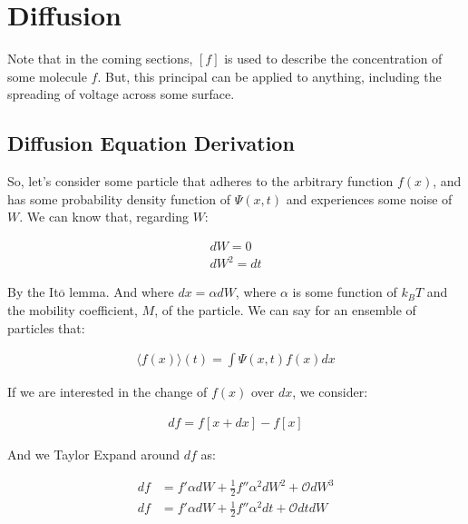 \section{Diffusion}

\label{sec:Diffusion}

 Note that in the coming sections, $[f]$ is used to describe the concentration of some molecule $f$. But, this principal can be applied to anything, including the spreading of voltage across some surface. 

 \subsection{Diffusion Equation Derivation}

So, let's consider some particle that adheres to the arbitrary function $f(x)$, and has some probability density function of $\Psi(x,t)$ and experiences some noise of $W$. We can know that, regarding $W$:

\begin{equation}
\begin{split}
    dW = 0 \\
    dW^2 = dt
\end{split}
\end{equation}

By the It$\overline{\mathrm{o}}$ lemma. And where $dx = \alpha dW$, where $\alpha$ is some function of $k_BT$ and the mobility coefficient, $M$, of the particle. We can say for an ensemble of particles that: 

\begin{equation}
\begin{split}
    \langle f(x) \rangle(t) = \int \Psi(x,t) f(x) dx
\end{split}
\end{equation}

If we are interested in the change of $f(x)$ over $dx$, we consider: 

\begin{equation}
\begin{split}
    df = f[x + dx] - f[x] 
\end{split}
\end{equation}

And we Taylor Expand around $df$ as: 

\begin{equation}
\begin{split}
    df & = f'\alpha dW + \frac{1}{2}f''\alpha^2 dW^2 + \mathcal{O}dW^3 \\
    df & = f'\alpha dW + \frac{1}{2}f''\alpha^2 dt + \mathcal{O}dtdW
\end{split}
\end{equation}

